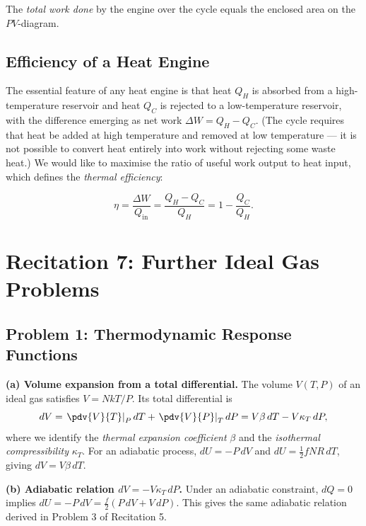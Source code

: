 The \emph{total work done} by the engine over the cycle equals the enclosed area on the $PV$-diagram.

\subsection{Efficiency of a Heat Engine}

The essential feature of any heat engine is that heat $Q_H$ is absorbed from a high-temperature reservoir and heat $Q_C$ is rejected to a low-temperature reservoir, with the difference emerging as net work $\Delta W = Q_H - Q_C$. (The cycle requires that heat be added at high temperature and removed at low temperature — it is not possible to convert heat entirely into work without rejecting some waste heat.) We would like to maximise the ratio of useful work output to heat input, which defines the \emph{thermal efficiency}:
\begin{definition}
\begin{equation}
    \eta = \frac{\Delta W}{Q_{\text{in}}} = \frac{Q_H - Q_C}{Q_H} = 1 - \frac{Q_C}{Q_H}.
\end{equation}
\end{definition}

\section{Recitation 7: Further Ideal Gas Problems}

\subsection{Problem 1: Thermodynamic Response Functions}

\textbf{(a) Volume expansion from a total differential.}
The volume $V(T, P)$ of an ideal gas satisfies $V = NkT/P$. Its total differential is
\begin{equation}
    dV = \left.\pdv{V}{T}\right|_P dT + \left.\pdv{V}{P}\right|_T dP = V\beta\,dT - V\kappa_T\,dP,
\end{equation}
where we identify the \emph{thermal expansion coefficient} $\beta$ and the \emph{isothermal compressibility} $\kappa_T$. For an adiabatic process, $dU = -P\,dV$ and $dU = \tfrac{1}{2}fNR\,dT$, giving $dV = V\beta\,dT$.

\textbf{(b) Adiabatic relation $dV = -V\kappa_T\,dP$.}
Under an adiabatic constraint, $dQ = 0$ implies $dU = -P\,dV = \tfrac{f}{2}(P\,dV + V\,dP)$. This gives the same adiabatic relation derived in Problem 3 of Recitation 5.

